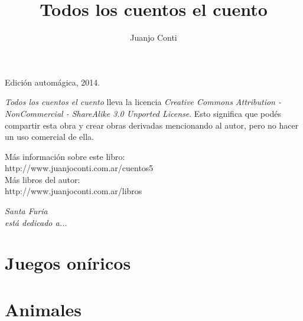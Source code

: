\documentclass[12pt,twoside,openright,a5paper]{book}
\title{Todos los cuentos el cuento}
\author{Juanjo Conti}
\date{}
\begin{document}
\pagestyle{plain}

\maketitle

\cleardoublepage

\thispagestyle{empty}
\noindent
Edición automágica, 2014.\\

\vspace{0.5cm}

\noindent
\emph{Todos los cuentos el cuento} lleva la licencia 
\emph{Creative Commons Attribution - NonCommercial - ShareAlike 3.0 Unported License}.
Esto significa que podés compartir esta obra y crear obras derivadas
mencionando al autor, pero no ha\-cer un uso comercial de ella.

\vfill

\noindent
Más información sobre este libro:\\
http://www.juanjoconti.com.ar/cuentos5\\

\noindent
Más libros del autor:\\
http://www.juanjoconti.com.ar/libros

\cleardoublepage

\noindent
\begin{flushright}
\emph{
\emph{Santa Furia}\\
está dedicado a...
}
\end{flushright}

\cleardoublepage

\renewcommand*\contentsname{Índice}
\tableofcontents

\part{Juegos oníricos}
 
 
 
 
 
 
 

\part{Animales}
 
 
 
 
 
 
 
 
\end{document}
